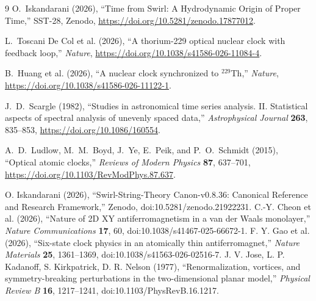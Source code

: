 \begin{thebibliography}{9}
O.~Iskandarani (2026),
``Time from Swirl: A Hydrodynamic Origin of Proper Time,''
SST-28, Zenodo, \url{https://doi.org/10.5281/zenodo.17877012}.

L.~Toscani De Col et al. (2026),
``A thorium-229 optical nuclear clock with feedback loop,''
\emph{Nature}, \url{https://doi.org/10.1038/s41586-026-11084-4}.

B.~Huang et al. (2026),
``A nuclear clock synchronized to $^{229}$Th,''
\emph{Nature}, \url{https://doi.org/10.1038/s41586-026-11122-1}.

J.~D.~Scargle (1982),
``Studies in astronomical time series analysis. II. Statistical aspects of spectral analysis of unevenly spaced data,''
\emph{Astrophysical Journal} \textbf{263}, 835--853,
\url{https://doi.org/10.1086/160554}.

A.~D.~Ludlow, M.~M.~Boyd, J.~Ye, E.~Peik, and P.~O.~Schmidt (2015),
``Optical atomic clocks,''
\emph{Reviews of Modern Physics} \textbf{87}, 637--701,
\url{https://doi.org/10.1103/RevModPhys.87.637}.
\end{thebibliography}

 O. Iskandarani (2026), ``Swirl-String-Theory Canon-v0.8.36: Canonical Reference and Research Framework,'' Zenodo, doi:10.5281/zenodo.21922231.
 C.-Y. Cheon et al. (2026), ``Nature of 2D XY antiferromagnetism in a van der Waals monolayer,'' \emph{Nature Communications} \textbf{17}, 60, doi:10.1038/s41467-025-66672-1.
 F. Y. Gao et al. (2026), ``Six-state clock physics in an atomically thin antiferromagnet,'' \emph{Nature Materials} \textbf{25}, 1361--1369, doi:10.1038/s41563-026-02516-7.
 J. V. Jose, L. P. Kadanoff, S. Kirkpatrick, D. R. Nelson (1977), ``Renormalization, vortices, and symmetry-breaking perturbations in the two-dimensional planar model,'' \emph{Physical Review B} \textbf{16}, 1217--1241, doi:10.1103/PhysRevB.16.1217.
